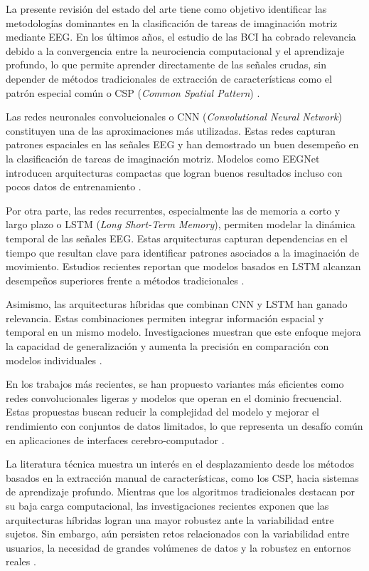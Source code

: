 La presente revisión del estado del arte tiene como objetivo identificar las metodologías dominantes en la clasificación de tareas de imaginación motriz mediante EEG. En los últimos años, el estudio de las BCI ha cobrado relevancia debido a la convergencia entre la neurociencia computacional y el aprendizaje profundo, lo que permite aprender directamente de las señales crudas,
sin depender de métodos tradicionales de extracción de características como el patrón especial común o CSP (\textit{Common Spatial Pattern}) \cite{schirrmeister2017deep}.

Las redes neuronales convolucionales o CNN (\textit{Convolutional Neural Network}) constituyen una de las aproximaciones más utilizadas. Estas redes capturan patrones espaciales en las señales EEG y han demostrado un buen desempeño en la clasificación de tareas de imaginación motriz. Modelos como EEGNet introducen arquitecturas compactas que logran buenos resultados incluso con pocos datos de entrenamiento \cite{lawhern2018eegnet}.

Por otra parte, las redes recurrentes, especialmente las de memoria a corto y largo plazo o LSTM (\textit{Long Short-Term Memory}), permiten modelar la dinámica temporal de las señales EEG. Estas arquitecturas capturan dependencias en el tiempo que resultan clave para identificar patrones asociados a la imaginación de movimiento. Estudios recientes reportan que modelos basados en LSTM alcanzan desempeños superiores frente a métodos tradicionales \cite{roy2019deep}.

Asimismo, las arquitecturas híbridas que combinan CNN y LSTM han ganado relevancia. Estas combinaciones permiten integrar información espacial y temporal en un mismo modelo. Investigaciones muestran que este enfoque mejora la capacidad de generalización y aumenta la precisión en comparación con modelos individuales  \cite{roy2019deep, bashivan2015learning}.

En los trabajos más recientes, se han propuesto variantes más eficientes como redes convolucionales ligeras y modelos que operan en el dominio frecuencial. Estas propuestas buscan reducir la complejidad del modelo y mejorar el rendimiento con conjuntos de datos limitados, lo que representa un desafío común en aplicaciones de interfaces cerebro-computador \cite{craik2019deep}.

La literatura técnica muestra un interés  en el desplazamiento desde los métodos basados en la extracción manual de características, como los CSP, hacia sistemas de aprendizaje profundo. Mientras que los algoritmos tradicionales destacan por su baja carga computacional, las investigaciones recientes exponen que las arquitecturas híbridas logran una mayor robustez ante la variabilidad entre sujetos. Sin embargo, aún persisten
retos relacionados con la variabilidad entre usuarios, la necesidad de grandes volúmenes de datos y la robustez en entornos reales \cite{roy2019deep}.

